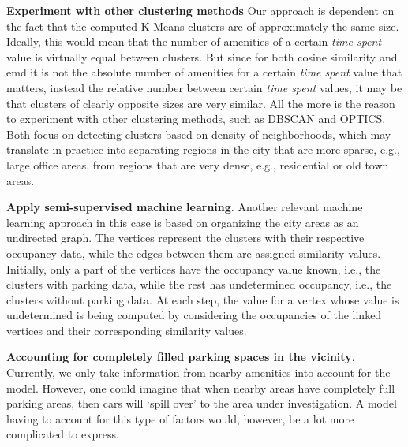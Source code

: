 \begin{romanlist}
		\item \textbf{Experiment with other clustering methods}
		Our approach is dependent on the fact that the computed K-Means clusters are of approximately the same size. Ideally, this would mean that the number of amenities of a certain \textit{time spent} value is virtually equal between clusters. But since for both cosine similarity and emd it is not the absolute number of amenities for a certain \textit{time spent} value that matters, instead the relative number between certain \textit{time spent} values, it may be that clusters of clearly opposite sizes are very similar. All the more is the reason to experiment with other clustering methods, such as DBSCAN and OPTICS. Both focus on detecting clusters based on density of neighborhoods, which may translate in practice into separating regions in the city that are more sparse, e.g., large office areas, from regions that are very dense, e.g., residential or old town areas.
		
		\item \textbf{Apply semi-supervised machine learning}.
		Another relevant machine learning approach in this case is based on organizing the city areas as an undirected graph.
		The vertices represent the clusters with their respective occupancy data, while the edges between them are assigned similarity values.
		Initially, only a part of the vertices have the occupancy value known, i.e., the clusters with parking data, while the rest has undetermined occupancy, i.e., the clusters without parking data.
		At each step, the value for a vertex whose value is undetermined is being computed by considering the occupancies of the linked vertices and their corresponding similarity values.
		
		\item \textbf{Accounting for completely filled parking spaces in the vicinity}.
		Currently, we only take information from nearby amenities into account for the model.
		However, one could imagine that when nearby areas have completely full parking areas, then cars will `spill over' to the area under investigation.
		A model having to account for this type of factors would, however, be a lot more complicated to express.
	\end{romanlist} 
	
	
